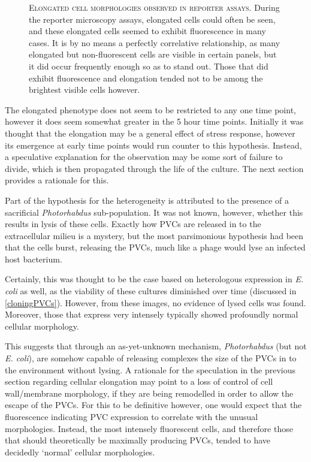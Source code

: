\begin{figure}[p]
\captionsetup{singlelinecheck=off, justification=justified, font=footnotesize, aboveskip=10pt}
\caption[Elongated cellular morphologies observed in reporter microscopy]{\textsc{\normalsize Elongated cell morphologies observed in reporter assays.} \vspace{0.1cm} \newline During the reporter microscopy assays, elongated cells could often be seen, and these elongated cells seemed to exhibit fluorescence in many cases. It is by no means a perfectly correlative relationship, as many elongated but non-fluorescent cells are visible in certain panels, but it did occur frequently enough so as to stand out. Those that did exhibit fluorescence and elongation tended not to be among the brightest visible cells however. }
\label{elongating}
\end{figure}

The elongated phenotype does not seem to be restricted to any one time point, however it does seem somewhat greater in the 5 hour time points. Initially it was thought that the elongation may be a general effect of stress response, however its emergence at early time points would run counter to this hypothesis. Instead, a speculative explanation for the observation may be some sort of failure to divide, which is then propagated through the life of the culture. The next section provides a rationale for this.


Part of the hypothesis for the heterogeneity is attributed to the presence of a sacrificial \emph{Photorhabdus} sub-population. It was not known, however, whether this results in lysis of these cells. Exactly how PVCs are released in to the extracellular milieu is a mystery, but the most parsimonious hypothesis had been that the cells burst, releasing the PVCs, much like a phage would lyse an infected host bacterium.

Certainly, this was thought to be the case based on heterologous expression in \emph{E. coli} as well, as the viability of these cultures diminished over time (discussed in \vref{cloningPVCs}). However, from these images, no evidence of lysed cells was found. Moreover, those that express very intensely typically showed profoundly normal cellular morphology.

This suggests that through an as-yet-unknown mechanism, \emph{Photorhabdus} (but not \emph{E. coli}), are somehow capable of releasing complexes the size of the PVCs in to the environment without lysing. A rationale for the speculation in the previous section regarding cellular elongation may point to a loss of control of cell wall/membrane morphology, if they are being remodelled in order to allow the escape of the PVCs. For this to be definitive however, one would expect that the fluorescence indicating PVC expression to correlate with the unusual morphologies. Instead, the most intensely fluorescent cells, and therefore those that should theoretically be maximally producing PVCs, tended to have decidedly `normal' cellular morphologies.

